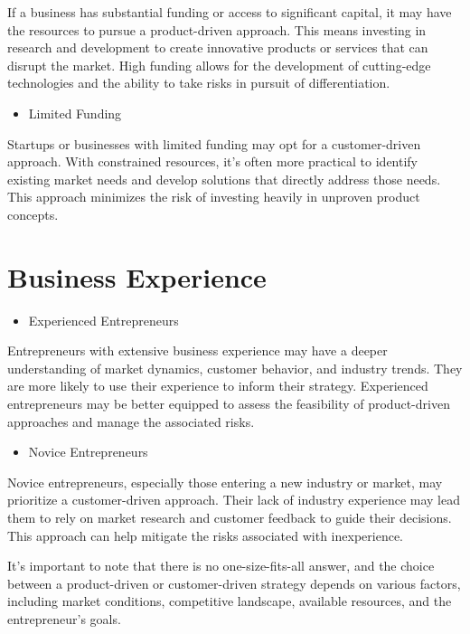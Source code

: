 \documentclass[
]{book}
\providecommand{\tightlist}{%
  \setlength{\itemsep}{0pt}\setlength{\parskip}{0pt}}
\begin{document}
If a business has substantial funding or access to significant capital, it may have the resources to pursue a product-driven approach. This means investing in research and development to create innovative products or services that can disrupt the market. High funding allows for the development of cutting-edge technologies and the ability to take risks in pursuit of differentiation.

\begin{itemize}
\tightlist
\item
  Limited Funding
\end{itemize}

Startups or businesses with limited funding may opt for a customer-driven approach. With constrained resources, it's often more practical to identify existing market needs and develop solutions that directly address those needs. This approach minimizes the risk of investing heavily in unproven product concepts.

\hypertarget{business-experience}{%
\section{Business Experience}\label{business-experience}}

\begin{itemize}
\tightlist
\item
  Experienced Entrepreneurs
\end{itemize}

Entrepreneurs with extensive business experience may have a deeper understanding of market dynamics, customer behavior, and industry trends. They are more likely to use their experience to inform their strategy. Experienced entrepreneurs may be better equipped to assess the feasibility of product-driven approaches and manage the associated risks.

\begin{itemize}
\tightlist
\item
  Novice Entrepreneurs
\end{itemize}

Novice entrepreneurs, especially those entering a new industry or market, may prioritize a customer-driven approach. Their lack of industry experience may lead them to rely on market research and customer feedback to guide their decisions. This approach can help mitigate the risks associated with inexperience.

It's important to note that there is no one-size-fits-all answer, and the choice between a product-driven or customer-driven strategy depends on various factors, including market conditions, competitive landscape, available resources, and the entrepreneur's goals.
\end{document}
